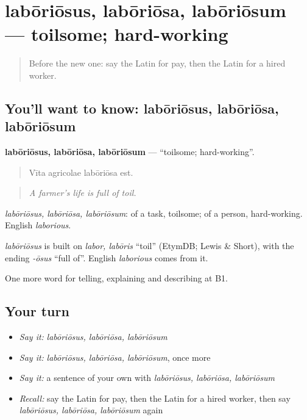 \section[labōriōsus, labōriōsa, labōriōsum]{labōriōsus, labōriōsa, labōriōsum — toilsome; hard-working}

\label{lesson:LA-C379-laboriosus}



\begin{quote}
Before the new one: say the Latin for pay, then the Latin for a hired worker.
\end{quote}

\subsection*{You'll want to know: labōriōsus, labōriōsa, labōriōsum}
\textbf{labōriōsus, labōriōsa, labōriōsum} — \textquotedblleft{}toilsome; hard-working\textquotedblright{}.

\begin{quote}
Vīta agricolae labōriōsa est.
\end{quote}

\begin{quote}
\emph{A farmer's life is full of toil.}
\end{quote}

\emph{labōriōsus, labōriōsa, labōriōsum}: of a task, toilsome; of a person, hard-working. English \emph{laborious}.

\begin{cousinweb}
\emph{labōriōsus} is built on \emph{labor, labōris} \textquotedblleft{}toil\textquotedblright{} (EtymDB; Lewis \& Short), with the ending \emph{-ōsus} \textquotedblleft{}full of\textquotedblright{}. English \emph{laborious} comes from it.
\end{cousinweb}

\begin{grammarlens}[title={What you've built}]
One more word for telling, explaining and describing at B1.
\end{grammarlens}

\subsection*{Your turn}
\begin{itemize}
\raggedright
  \item \emph{Say it:} \emph{labōriōsus, labōriōsa, labōriōsum}
  \item \emph{Say it:} \emph{labōriōsus, labōriōsa, labōriōsum}, once more
  \item \emph{Say it:} a sentence of your own with \emph{labōriōsus, labōriōsa, labōriōsum}
  \item \emph{Recall:} say the Latin for pay, then the Latin for a hired worker, then say \emph{labōriōsus, labōriōsa, labōriōsum} again
\end{itemize}

